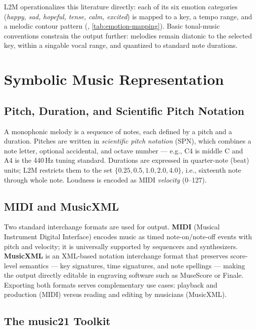 L2M operationalizes this literature directly: each of its six emotion
categories (\emph{happy, sad, hopeful, tense, calm, excited}) is mapped to a
key, a tempo range, and a melodic contour pattern
(, \ref{tab:emotion-mapping}). Basic
tonal-music conventions constrain the output further: melodies remain
diatonic to the selected key, within a singable vocal range, and quantized
to standard note durations.

\section{Symbolic Music Representation}
\label{sec:bg-symbolic}

\subsection{Pitch, Duration, and Scientific Pitch Notation}

A monophonic melody is a sequence of notes, each defined by a pitch and a
duration. Pitches are written in \emph{scientific pitch notation} (SPN),
which combines a note letter, optional accidental, and octave number ---
e.g., C4 is middle C and A4 is the 440\,Hz tuning standard. Durations are
expressed in quarter-note (beat) units; L2M restricts them to the set
$\{0.25, 0.5, 1.0, 2.0, 4.0\}$, i.e., sixteenth note through whole note.
Loudness is encoded as MIDI \emph{velocity} (0--127).

\subsection{MIDI and MusicXML}

Two standard interchange formats are used for output. \textbf{MIDI}
(Musical Instrument Digital Interface) encodes music as timed note-on/note-off
events with pitch and velocity; it is universally supported by sequencers
and synthesizers. \textbf{MusicXML} \cite{good01musicxml} is an XML-based
notation interchange format that preserves score-level semantics --- key
signatures, time signatures, and note spellings --- making the output
directly editable in engraving software such as MuseScore or Finale.
Exporting both formats serves complementary use cases: playback and
production (MIDI) versus reading and editing by musicians (MusicXML).

\subsection{The music21 Toolkit}

